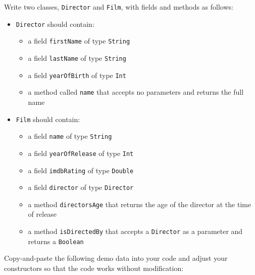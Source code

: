 \documentclass[11pt,a5paper,]{book}
\providecommand{\tightlist}{%
  \setlength{\itemsep}{0pt}\setlength{\parskip}{0pt}}
\begin{document}
Write two classes, \texttt{Director} and \texttt{Film}, with fields and
methods as follows:

\begin{itemize}
\tightlist
\item
  \texttt{Director} should contain:

  \begin{itemize}
  \tightlist
  \item
    a field \texttt{firstName} of type \texttt{String}
  \item
    a field \texttt{lastName} of type \texttt{String}
  \item
    a field \texttt{yearOfBirth} of type \texttt{Int}
  \item
    a method called \texttt{name} that accepts no parameters and returns
    the full name
  \end{itemize}
\item
  \texttt{Film} should contain:

  \begin{itemize}
  \tightlist
  \item
    a field \texttt{name} of type \texttt{String}
  \item
    a field \texttt{yearOfRelease} of type \texttt{Int}
  \item
    a field \texttt{imdbRating} of type \texttt{Double}
  \item
    a field \texttt{director} of type \texttt{Director}
  \item
    a method \texttt{directorsAge} that returns the age of the director
    at the time of release
  \item
    a method \texttt{isDirectedBy} that accepts a \texttt{Director} as a
    parameter and returns a \texttt{Boolean}
  \end{itemize}
\end{itemize}

Copy-and-paste the following demo data into your code and adjust your
constructors so that the code works without modification:
\end{document}
